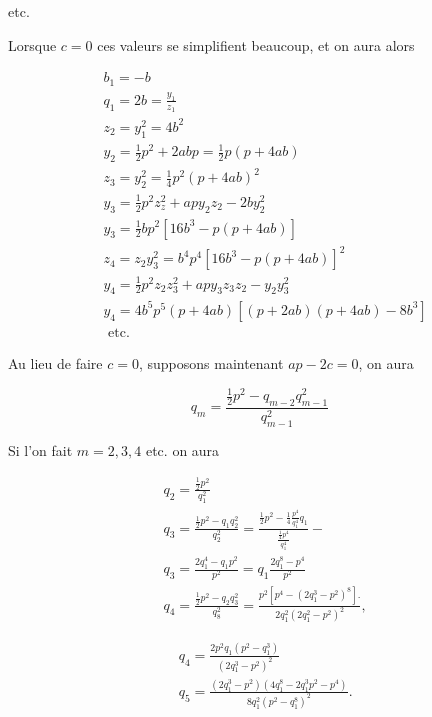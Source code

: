 \documentclass{article}
\begin{document}
etc.

Lorsque \(c=0\) ces valeurs se simplifient beaucoup, et on aura alors

\[
\begin{aligned}
& b_{1}=-b \\
& q_{1}=2 b=\frac{y_{1}}{z_{1}} \\
& z_{2}=y_{1}^{2}=4 b^{2} \\
& y_{2}=\frac{1}{2} p^{2}+2 a b p=\frac{1}{2} p(p+4 a b) \\
& z_{3}=y_{2}^{2}=\frac{1}{4} p^{2}(p+4 a b)^{2} \\
& y_{3}=\frac{1}{2} p^{2} z_{z}^{2}+a p y_{2} z_{2}-2 b y_{2}^{2} \\
& y_{3}=\frac{1}{2} b p^{2}\left[16 b^{3}-p(p+4 a b)\right] \\
& z_{4}=z_{2} y_{3}^{2}=b^{4} p^{4}\left[16 b^{3}-p(p+4 a b)\right]^{2} \\
& y_{4}=\frac{1}{2} p^{2} z_{2} z_{3}^{2}+a p y_{3} z_{3} z_{2}-y_{2} y_{3}^{2} \\
& y_{4}=4 b^{5} p^{5}(p+4 a b)\left[(p+2 a b)(p+4 a b)-8 b^{3}\right] \\
& \text { etc. }
\end{aligned}
\]

Au lieu de faire \(c=0\), supposons maintenant \(a p-2 c=0\), on aura

\[
q_{m}=\frac{\frac{1}{2} p^{2}-q_{m-2} q_{m-1}^{2}}{q_{m-1}^{2}}
\]

Si l'on fait \(m=2,3,4\) etc. on aura

\[
\begin{aligned}
& q_{2}=\frac{\frac{1}{2} p^{2}}{q_{1}^{2}} \\
& q_{3}=\frac{\frac{1}{2} p^{2}-q_{1} q_{2}^{2}}{q_{2}^{2}}=\frac{\frac{1}{2} p^{2}-\frac{1}{4} \frac{p^{4}}{q_{1}^{4}} q_{1}}{\frac{\frac{1}{4} p^{4}}{q_{1}^{4}}}- \\
& q_{3}=\frac{2 q_{1}^{4}-q_{1} p^{2}}{p^{2}}=q_{1} \frac{2 q_{1}^{8}-p^{4}}{p^{2}} \\
& q_{4}=\frac{\frac{1}{2} p^{2}-q_{2} q_{3}^{2}}{q_{8}^{2}}=\frac{p^{2}\left[p^{4}-\left(2 q_{1}^{3}-p^{2}\right)^{8}\right] .}{2 q_{1}^{2}\left(2 q_{1}^{2}-p^{2}\right)^{2}},
\end{aligned}
\]

\[
\begin{aligned}
& q_{4}=\frac{2 p^{2} q_{1}\left(p^{2}-q_{1}^{3}\right)}{\left(2 q_{1}^{3}-p^{2}\right)^{2}} \\
& q_{5}=\frac{\left(2 q_{1}^{3}-p^{2}\right)\left(4 q_{1}^{8}-2 q_{1}^{3} p^{2}-p^{4}\right)}{8 q_{1}^{2}\left(p^{2}-q_{1}^{8}\right)^{2}} .
\end{aligned}
\]
\end{document}
